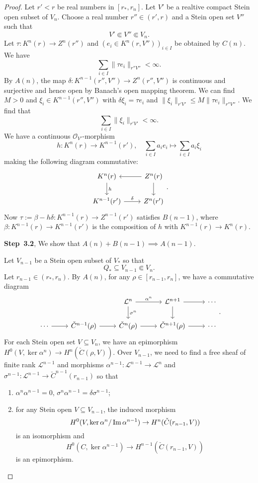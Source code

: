 \begin{proof}
Let $r'<r$ be real numbers in $[r_*,r_n]$. Let $V'$ be a realtive compact Stein open subset of $V_n$. Choose a real number $r''\in (r',r)$ and a Stein open set $V''$ such that 
\[
    V'\Subset V''\Subset V_n.
\]
Let $\tau:K^n(r)\rightarrow Z^n(r'')$ and $(e_i\in K^n(r,V''))_{i\in I}$ be obtained by $C(n)$. We have
\[
\sum_{i\in I} \|\tau e_i\|_{r''V''}<\infty.
\]
By $A(n)$, the map $\delta:K^{n-1}(r'',V'')\rightarrow Z^n(r'',V'')$ is continuous and surjective and hence open by Banach's open mapping theorem. We can find $M>0$ and $\xi_i\in K^{n-1}(r'',V'')$ with $\delta\xi_i=\tau e_i$ and $\|\xi_i\|_{r'V'}\leq M\|\tau e_i\|_{r''V''}$. We find that
\[
\sum_{i\in I}\|\xi_i\|_{r'V'}<\infty.    
\]
We have a continuous $\mathcal{O}_{V'}$-morphism
\[
        h:K^n(r)\rightarrow K^{n-1}(r'),\quad \sum_{i\in I}a_i e_i\mapsto \sum_{i\in I}a_i\xi_i
\]
making the following diagram commutative:
\[
    \begin{tikzcd}
        K^n(r) \arrow[d, "h"]           & Z^n(r) \arrow[l] \arrow[d] \\
        K^{n-1}(r') \arrow[r, "\delta"] & Z^n(r')                   
        \end{tikzcd}.    
\]
Now $\tau:=\beta-h\delta:K^{n-1}(r)\rightarrow Z^{n-1}(r')$ satisfies $B(n-1)$, where $\beta:K^{n-1}(r)\rightarrow K^{n-1}(r')$ is the composition of $h$ with $K^{n-1}(r)\rightarrow K^n(r)$.

\textbf{Step~3.2}, We show that $A(n)+B(n-1)\implies A(n-1)$.

Let $V_{n-1}$ be a Stein open subset of $V_*$ so that
\[
    Q_*\subseteq V_{n-1}\Subset V_n.
\]  
Let $r_{n-1}\in (r_*,r_n)$. By $A(n)$, for any $\rho\in [r_{n-1},r_n]$, we have a commutative diagram
\[
    \begin{tikzcd}
        &                                 & \mathcal{L}^n \arrow[d, "\sigma^n"] \arrow[r,"\alpha^n"] & \mathcal{L}^{n+1} \arrow[d] \arrow[r] & \cdots \\
\cdots \arrow[r] & \check{C}^{n-1}(\rho) \arrow[r] & \check{C}^n(\rho) \arrow[r]                   & \check{C}^{n+1}(\rho) \arrow[r]       & \cdots
\end{tikzcd}.    
\]
For each Stein open set $V\subseteq V_n$, we have an epimorphism $H^0(V,\ker \alpha^n)\rightarrow H^n(\check{C}(\rho,V))$. Over $V_{n-1}$, we need to find a free sheaf of finite rank $\mathcal{L}^{n-1}$ and morphisms $\alpha^{n-1}:\mathcal{L}^{n-1}\rightarrow \mathcal{L}^n$ and $\sigma^{n-1}:\mathcal{L}^{n-1}\rightarrow \check{C}^{n-1}(r_{n-1})$ so that 
\begin{enumerate}
    \item $\alpha^{n}\alpha^{n-1}=0$, $\sigma^n\alpha^{n-1}=\delta \sigma^{n-1}$;
    \item for any Stein open $V\subseteq V_{n-1}$, the induced morphism
        \[
            H^0(V,\ker \alpha^n/\operatorname{Im} \alpha^{n-1})\rightarrow H^n(\check{C}(r_{n-1},V))
        \]
        is an isomorphism and
        \[
            H^0(C,\ker \alpha^{n-1}) \rightarrow H^{n-1}(\check{C}(r_{n-1},V)) 
        \]
        is an epimorphism.
\end{enumerate}


\end{proof}
